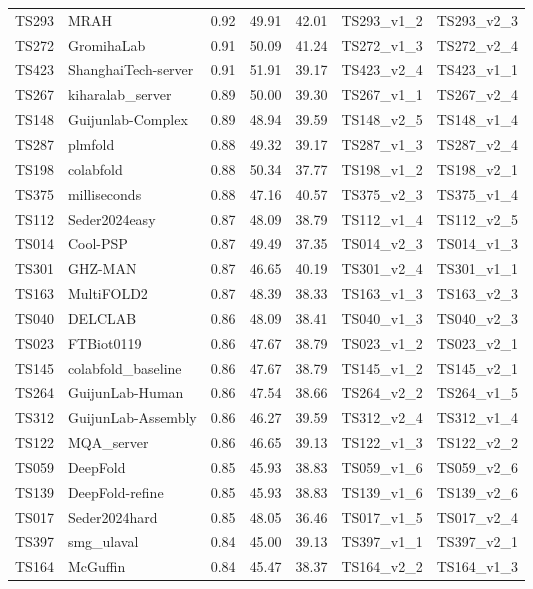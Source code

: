 \begin{longtable}{lllllll}
TS293 & MRAH & 0.92 & 49.91 & 42.01 & TS293\_v1\_2 & TS293\_v2\_3 \\ 
TS272 & GromihaLab & 0.91 & 50.09 & 41.24 & TS272\_v1\_3 & TS272\_v2\_4 \\ 
TS423 & ShanghaiTech-server & 0.91 & 51.91 & 39.17 & TS423\_v2\_4 & TS423\_v1\_1 \\ 
TS267 & kiharalab\_server & 0.89 & 50.00 & 39.30 & TS267\_v1\_1 & TS267\_v2\_4 \\ 
TS148 & Guijunlab-Complex & 0.89 & 48.94 & 39.59 & TS148\_v2\_5 & TS148\_v1\_4 \\ 
TS287 & plmfold & 0.88 & 49.32 & 39.17 & TS287\_v1\_3 & TS287\_v2\_4 \\ 
TS198 & colabfold & 0.88 & 50.34 & 37.77 & TS198\_v1\_2 & TS198\_v2\_1 \\ 
TS375 & milliseconds & 0.88 & 47.16 & 40.57 & TS375\_v2\_3 & TS375\_v1\_4 \\ 
TS112 & Seder2024easy & 0.87 & 48.09 & 38.79 & TS112\_v1\_4 & TS112\_v2\_5 \\ 
TS014 & Cool-PSP & 0.87 & 49.49 & 37.35 & TS014\_v2\_3 & TS014\_v1\_3 \\ 
TS301 & GHZ-MAN & 0.87 & 46.65 & 40.19 & TS301\_v2\_4 & TS301\_v1\_1 \\ 
TS163 & MultiFOLD2 & 0.87 & 48.39 & 38.33 & TS163\_v1\_3 & TS163\_v2\_3 \\ 
TS040 & DELCLAB & 0.86 & 48.09 & 38.41 & TS040\_v1\_3 & TS040\_v2\_3 \\ 
TS023 & FTBiot0119 & 0.86 & 47.67 & 38.79 & TS023\_v1\_2 & TS023\_v2\_1 \\ 
TS145 & colabfold\_baseline & 0.86 & 47.67 & 38.79 & TS145\_v1\_2 & TS145\_v2\_1 \\ 
TS264 & GuijunLab-Human & 0.86 & 47.54 & 38.66 & TS264\_v2\_2 & TS264\_v1\_5 \\ 
TS312 & GuijunLab-Assembly & 0.86 & 46.27 & 39.59 & TS312\_v2\_4 & TS312\_v1\_4 \\ 
TS122 & MQA\_server & 0.86 & 46.65 & 39.13 & TS122\_v1\_3 & TS122\_v2\_2 \\ 
TS059 & DeepFold & 0.85 & 45.93 & 38.83 & TS059\_v1\_6 & TS059\_v2\_6 \\ 
TS139 & DeepFold-refine & 0.85 & 45.93 & 38.83 & TS139\_v1\_6 & TS139\_v2\_6 \\ 
TS017 & Seder2024hard & 0.85 & 48.05 & 36.46 & TS017\_v1\_5 & TS017\_v2\_4 \\ 
TS397 & smg\_ulaval & 0.84 & 45.00 & 39.13 & TS397\_v1\_1 & TS397\_v2\_1 \\ 
TS164 & McGuffin & 0.84 & 45.47 & 38.37 & TS164\_v2\_2 & TS164\_v1\_3 \\ 

\end{longtable}

